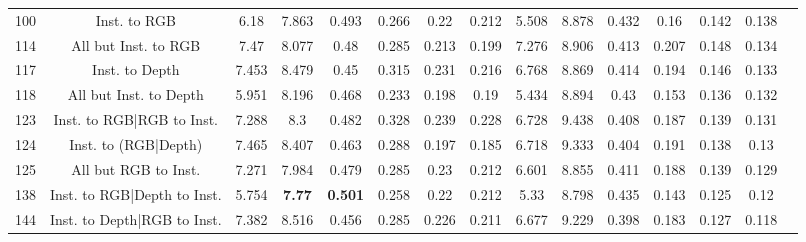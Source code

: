 \begin{table}
\begin{tabular}{@{\hskip3pt}c@{\hskip3pt}c@{\hskip3pt}c@{\hskip3pt}c@{\hskip3pt}c@{\hskip3pt}c@{\hskip3pt}c@{\hskip3pt}c@{\hskip3pt}c@{\hskip3pt}c@{\hskip3pt}c@{\hskip3pt}c@{\hskip3pt}c@{\hskip3pt}c@{\hskip3pt}c}
        100 &                   Inst. to RGB &              6.18 &          7.863 &           0.493 &           0.266 &            0.22 &           0.212 &               5.508 &         8.878 &           0.432 &            0.16 &           0.142 &           0.138 \\
        114 &           All but Inst. to RGB &              7.47 &          8.077 &            0.48 &           0.285 &           0.213 &           0.199 &               7.276 &         8.906 &           0.413 &           0.207 &           0.148 &           0.134 \\
        117 &                 Inst. to Depth &             7.453 &          8.479 &            0.45 &           0.315 &           0.231 &           0.216 &               6.768 &         8.869 &           0.414 &           0.194 &           0.146 &           0.133 \\
        118 &         All but Inst. to Depth &             5.951 &          8.196 &           0.468 &           0.233 &           0.198 &            0.19 &               5.434 &         8.894 &            0.43 &           0.153 &           0.136 &           0.132 \\
        123 &      Inst. to RGB|RGB to Inst. &             7.288 &            8.3 &           0.482 &           0.328 &           0.239 &           0.228 &               6.728 &         9.438 &           0.408 &           0.187 &           0.139 &           0.131 \\
        124 &           Inst. to (RGB|Depth) &             7.465 &          8.407 &           0.463 &           0.288 &           0.197 &           0.185 &               6.718 &         9.333 &           0.404 &           0.191 &           0.138 &            0.13 \\
        125 &           All but RGB to Inst. &             7.271 &          7.984 &           0.479 &           0.285 &            0.23 &           0.212 &               6.601 &         8.855 &           0.411 &           0.188 &           0.139 &           0.129 \\
        138 &    Inst. to RGB|Depth to Inst. &             5.754 &  \textbf{7.77} &  \textbf{0.501} &           0.258 &            0.22 &           0.212 &                5.33 &         8.798 &           0.435 &           0.143 &           0.125 &            0.12 \\
        144 &    Inst. to Depth|RGB to Inst. &             7.382 &          8.516 &           0.456 &           0.285 &           0.226 &           0.211 &               6.677 &         9.229 &           0.398 &           0.183 &           0.127 &           0.118 \\

\end{tabular}
\end{table}
